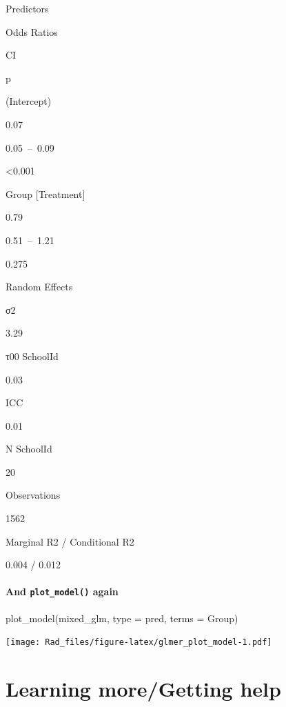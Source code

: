 \documentclass[
]{book}
\newenvironment{Shaded}{\begin{snugshade}}{\end{snugshade}}
\newcommand{\AttributeTok}[1]{\textcolor[rgb]{0.77,0.63,0.00}{#1}}
\newcommand{\FunctionTok}[1]{\textcolor[rgb]{0.00,0.00,0.00}{#1}}
\newcommand{\NormalTok}[1]{#1}
\newcommand{\StringTok}[1]{\textcolor[rgb]{0.31,0.60,0.02}{#1}}
\begin{document}
Predictors

Odds Ratios

CI

p

(Intercept)

0.07

0.05~--~0.09

\textless0.001

Group {[}Treatment{]}

0.79

0.51~--~1.21

0.275

Random Effects

σ2

3.29

τ00 SchoolId

0.03

ICC

0.01

N SchoolId

20

Observations

1562

Marginal R2 / Conditional R2

0.004 / 0.012

\hypertarget{and-plot_model-again}{%
\subsubsection{\texorpdfstring{And \texttt{plot\_model()} again}{And plot\_model() again}}\label{and-plot_model-again}}

\begin{Shaded}
\begin{Highlighting}[]
\FunctionTok{plot\_model}\NormalTok{(mixed\_glm,}
           \AttributeTok{type =} \StringTok{\textquotesingle{}pred\textquotesingle{}}\NormalTok{,}
           \AttributeTok{terms =} \StringTok{\textquotesingle{}Group\textquotesingle{}}\NormalTok{)}
\end{Highlighting}
\end{Shaded}

\texttt{[image: Rad\_files/figure-latex/glmer\_plot\_model-1.pdf]}

\hypertarget{learning-moregetting-help}{%
\chapter*{Learning more/Getting help}\label{learning-moregetting-help}}
\end{document}
